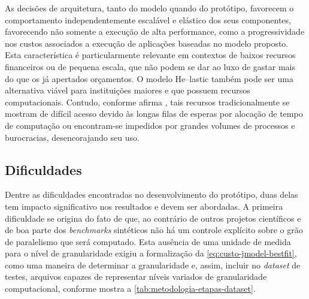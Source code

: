 \documentclass[english,brazilian]{UNISINOSmonografia} %
\begin{document}
As decisões de arquitetura, tanto do modelo quando do protótipo, favorecem o comportamento independentemente escalável e elástico dos seus componentes, favorecendo não somente a execução de alta performance, como a progressividade nos custos associados a execução de aplicações baseadas no modelo proposto.
%
Esta característica é particularmente relevante em contextos de baixos recursos financeiros ou de pequena escala, que não podem se dar ao luxo de gastar mais do que os já apertados orçamentos.
%
O modelo \textsf{He}--lastic também pode ser uma alternativa viável para instituições maiores e que possuem recursos computacionais.
%
Contudo, conforme afirma , tais recursos tradicionalmente se mostram de difícil acesso devido às longas filas de esperas por alocação de tempo de computação ou encontram-se impedidos por grandes volumes de processos e burocracias, desencorajando seu uso.






\subsection{Dificuldades}
\label{sec:metodologia-prototipo-dificuldades}


Dentre as dificuldades encontradas no desenvolvimento do protótipo, duas delas tem impacto significativo nos resultados e devem ser abordadas.
%
A primeira dificuldade se origina do fato de que, ao contrário de outros projetos científicos e de boa parte dos \textit{benchmarks} sintéticos não há um controle explícito sobre o grão de paralelismo que será computado.
%
Esta ausência de uma unidade de medida para o nível de granularidade exigiu a formalização da \autoref{eq:custo-jmodel-bestfit}, como uma maneira de determinar a granularidade e, assim, incluir no \textit{dataset} de testes, arquivos capazes de representar níveis variados de granularidade computacional, conforme mostra a \autoref{tab:metodologia-etapas-dataset}.
\end{document}
